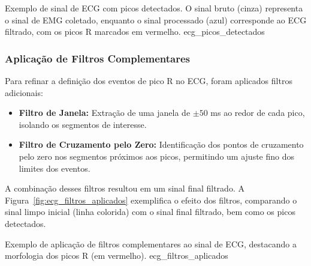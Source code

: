 {Exemplo de sinal de ECG com picos detectados. O sinal bruto (cinza) representa o sinal de EMG coletado, enquanto o sinal processado (azul) corresponde ao ECG filtrado, com os picos R marcados em vermelho.}
{ecg_picos_detectados}

\subsubsection{Aplicação de Filtros Complementares}
Para refinar a definição dos eventos de pico R no ECG, foram aplicados filtros adicionais:
\begin{itemize}
    \item \textbf{Filtro de Janela:} Extração de uma janela de \(\pm50\) ms ao redor de cada pico, isolando os segmentos de interesse.
    \item \textbf{Filtro de Cruzamento pelo Zero:} Identificação dos pontos de cruzamento pelo zero nos segmentos próximos aos picos, permitindo um ajuste fino dos limites dos eventos.
\end{itemize}

A combinação desses filtros resultou em um sinal final filtrado. A Figura~\ref{fig:ecg_filtros_aplicados} exemplifica o efeito dos filtros, comparando o sinal limpo inicial (linha colorida) com o sinal final filtrado, bem como os picos detectados.

{Exemplo de aplicação de filtros complementares ao sinal de ECG, destacando a morfologia dos picos R (em vermelho).}
{ecg_filtros_aplicados}

